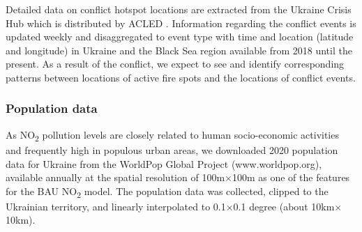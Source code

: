 Detailed data on conflict hotspot locations are extracted from the Ukraine Crisis Hub which is distributed by ACLED \citep{raleigh2010introducing}. Information regarding the conflict events is updated weekly and disaggregated to event type with time and location (latitude and longitude) in Ukraine and the Black Sea region available from 2018 until the present. As a result of the conflict, we expect to see and identify corresponding patterns between locations of active fire spots and the locations of conflict events. \par
\subsubsection*{Population data}
As NO\textsubscript{2} pollution levels are closely related to human socio-economic activities and frequently high in populous urban areas, we downloaded 2020 population data for Ukraine from the WorldPop Global Project (www.worldpop.org), available annually at the spatial resolution of 100m$\times$100m as one of the features for the BAU NO\textsubscript{2} model. The population data was collected, clipped to the Ukrainian territory, and linearly interpolated to 0.1$\times$0.1 degree (about 10km$\times$10km).\par
